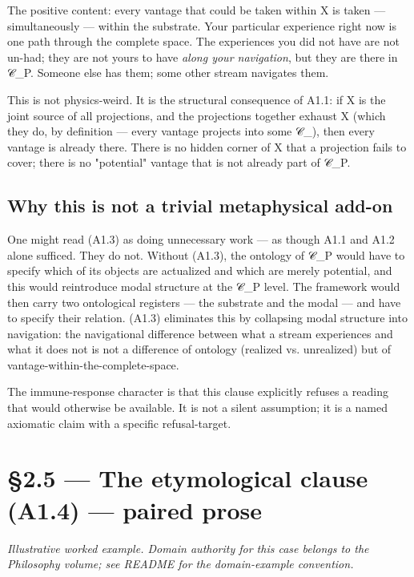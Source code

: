 \documentclass[11pt, openany]{book}
\newcommand{\sectionbreak}{\clearpage}
\begin{document}
The positive content: every vantage that could be taken within X is taken --- simultaneously --- within the substrate. Your particular experience right now is one path through the complete space. The experiences you did not have are not un-had; they are not yours to have \textit{along your navigation}, but they are there in 𝒞\_\allowbreak{}P. Someone else has them; some other stream navigates them.

This is not physics-weird. It is the structural consequence of A1.1: if X is the joint source of all projections, and the projections together exhaust X (which they do, by definition --- every vantage projects into some 𝒞\_), then every vantage is already there. There is no hidden corner of X that a projection fails to cover; there is no "potential" vantage that is not already part of 𝒞\_\allowbreak{}P.

\subsection{Why this is not a trivial metaphysical add-on}

One might read (A1.3) as doing unnecessary work --- as though A1.1 and A1.2 alone sufficed. They do not. Without (A1.3), the ontology of 𝒞\_\allowbreak{}P would have to specify which of its objects are actualized and which are merely potential, and this would reintroduce modal structure at the 𝒞\_\allowbreak{}P level. The framework would then carry two ontological registers --- the substrate and the modal --- and have to specify their relation. (A1.3) eliminates this by collapsing modal structure into navigation: the navigational difference between what a stream experiences and what it does not is not a difference of ontology (realized vs. unrealized) but of vantage-within-the-complete-space.

The immune-response character is that this clause explicitly refuses a reading that would otherwise be available. It is not a silent assumption; it is a named axiomatic claim with a specific refusal-target.

\sectionbreak

\section{§2.5 --- The etymological clause (A1.4) --- paired prose}

\textit{Illustrative worked example. Domain authority for this case belongs to the Philosophy volume; see README for the domain-example convention.}
\end{document}
